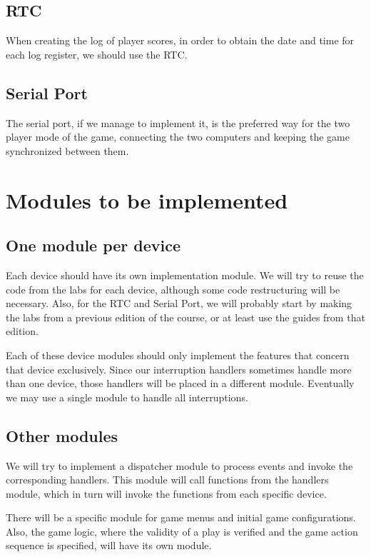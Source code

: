 \documentclass[11pt,a4paper,reqno]{report}
\numberwithin{equation}{section}
\begin{document}
\section{RTC}

When creating the log of player scores, in order to obtain the date and time for each log register, we should use the RTC.

\section{Serial Port}

The serial port, if we manage to implement it, is the preferred way for the two player mode of the game, connecting the two computers and keeping the game synchronized between them.

\chapter{Modules to be implemented}

\section{One module per device}

Each device should have its own implementation module. We will try to reuse the code from the labs for each device, although some code restructuring will be necessary. Also, for the RTC and Serial Port, we will probably start by making the labs from a previous edition of the course, or at least use the guides from that edition.

Each of these device modules should only implement the features that concern that device exclusively. Since our interruption handlers sometimes handle more than one device, those handlers will be placed in a different module. Eventually we may use a single module to handle all interruptions.

\section{Other modules}

We will try to implement a dispatcher module to process events and invoke the corresponding handlers. This module will call functions from the handlers module, which in turn will invoke the functions from each specific device.

There will be a specific module for game menus and initial game configurations. Also, the game logic, where the validity of a play is verified and the game action sequence is specified, will have its own module.
\end{document}
